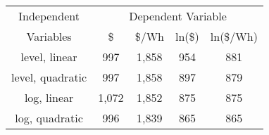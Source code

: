 \begin{tabular}{|c|cccc|}\hline
Independent & \multicolumn{4}{c|}{Dependent Variable}  \\ \cline{2-5}
Variables &  \$ \Tstrut   &  \$/Wh  & ln(\$) & ln(\$/Wh)  \\\hline
level, linear     &   997    &  1,858 & 954  &   881  \\
level, quadratic    &   997    &  1,858 & 897  &   879  \\
log, linear    &   1,072 &    1,852  & 875 & 875   \\
log, quadratic    &   996    &  1,839 & 865  &  865  \\\hline
\end{tabular}